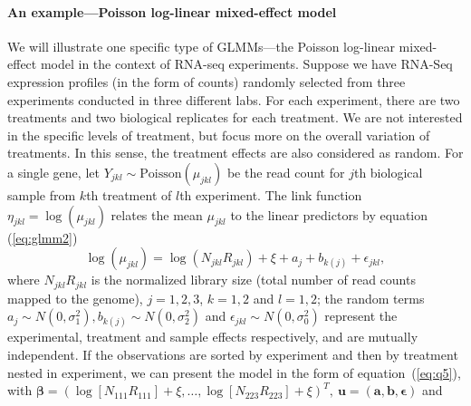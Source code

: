 \paragraph{An example---Poisson log-linear mixed-effect model}\label{poisson} 
We will illustrate one specific type of GLMMs---the Poisson log-linear mixed-effect model in the 
context of RNA-seq experiments. Suppose we have RNA-Seq expression profiles (in the form of 
counts)
randomly selected from three experiments conducted in three different labs. For each experiment, 
there are two treatments and two biological replicates for each treatment. We are not interested in 
the specific levels of treatment, but focus
more on the overall variation of treatments. In this sense, the treatment effects are also
considered as random. For a single gene, let $Y_{jkl}\sim \text{Poisson}(\mu_{jkl})$ be the read
count for $j$th biological sample from $k$th treatment of $l$th experiment. The link function
$\eta_{jkl} = \log (\mu_{jkl})$ relates the mean $\mu_{jkl}$ to the linear predictors by equation
(\ref{eq:glmm2})  
\begin{equation}\label{eq:example}
	\log (\mu_{jkl}) = \log (N_{jkl}R_{jkl}) + \xi + a_{j} + b_{k(j)} + \epsilon_{jkl},
\end{equation}
where $N_{jkl}R_{jkl}$ is the normalized library size (total number of read counts mapped to the
genome),  $j=1, 2,  3$, $k=1, 2$ and $l=1, 2$; the random terms $a_j \sim N(0, \sigma_1^2), 
b_{k(j)}\sim N(0,\sigma_2^2)$ and $\epsilon_{jkl}\sim N(0, \sigma_0^2)$ represent the experimental, 
treatment and sample effects respectively, and are mutually independent. If
the observations are sorted by experiment and then by treatment nested in experiment, we can present
the model in the form of equation~(\ref{eq:q5}), with  $\bm \beta = (\log [N_{111}R_{111}]  +
\xi,\ldots, \log [N_{223}R_{223}]  + \xi)^T, ~\bm u = (\bm a, \bm b, \bm \epsilon)$ and 
